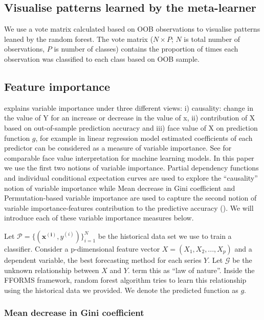 \documentclass[11pt,a4paper,]{article}
\begin{document}
\subsection{Visualise patterns learned by the
meta-learner}\label{visualise-patterns-learned-by-the-meta-learner}

We use a vote matrix calculated based on OOB observations to visualise
patterns leaned by the random forest. The vote matrix (\(N \times P\);
\(N\) is total number of observations, \(P\) is number of classes)
contains the proportion of times each observation was classified to each
class based on OOB sample.

\subsection{Feature importance}\label{feature-importance}

\textcite{jiang2002} explains variable importance under three different
views: i) causality: change in the value of Y for an increase or
decrease in the value of x, ii) contribution of X based on out-of-sample
prediction accuracy and iii) face value of X on prediction function
\(g\), for example in linear regression model estimated coefficients of
each predictor can be considered as a measure of variable importance.
See \textcite{jiang2002} for comparable face value interpretation for
machine learning models. In this paper we use the first two notions of
variable importance. Partial dependency functions and individual
conditional expectation curves are used to explore the ``causality''
notion of variable importance while Mean decrease in Gini coefficient
and Permutation-based variable importance are used to capture the second
notion of variable importance-features contribution to the predictive
accuracy (\textcite{Zhao}). We will introduce each of these variable
importance measures below.

Let \(\mathcal{P}=\{(\mathbf{x^{(i)}}, y^{(i)})\}_{i=1}^{N}\) be the
historical data set we use to train a classifier. Consider a
p-dimensional feature vector \(X=(X_1, X_2, ..., X_p)\) and a dependent
variable, the best forecasting method for each series \(Y\). Let
\(\mathcal{G}\) be the unknown relationship between \(X\) and \(Y\).
\textcite{Zhao} term this as ``law of nature''. Inside the FFORMS
framework, random forest algorithm tries to learn this relationship
using the historical data we provided. We denote the predicted function
as \(g\).

\subsubsection{Mean decrease in Gini
coefficient}\label{mean-decrease-in-gini-coefficient}
\end{document}
